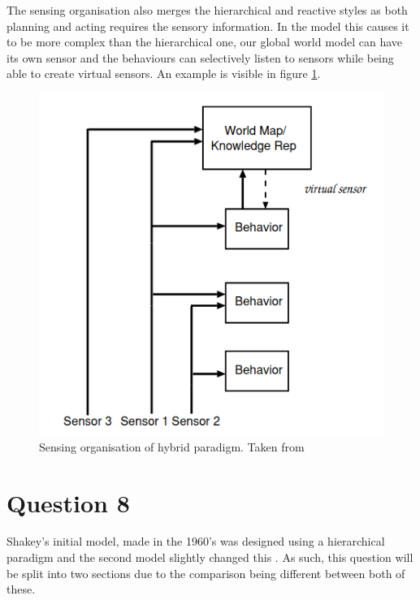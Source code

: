 \documentclass{article}
\newcommand\tab[1][1cm]{\hspace*{#1}}
\begin{document}
\tab The sensing organisation also merges the hierarchical and reactive styles as both planning and
acting requires the sensory
information. In the model this causes it to be more complex than the hierarchical one, our global world model can have its
own sensor and the behaviours can selectively listen to sensors while being able to create virtual sensors.
An example is visible in figure \ref{sOrg}.
\begin{figure}[ht]
    \centering
    \includegraphics[scale=0.5]{img/sensing-organisation.png}
    \caption{Sensing organisation of hybrid paradigm. Taken from \cite{IntroToAI}}
    \label{sOrg}
\end{figure}
\newpage
\section*{Question 8}
Shakey's initial model, made in the 1960's was designed using a hierarchical
paradigm and the second model slightly changed this \cite{shakeyHistory}. As
such, this question will be split into two sections due to the comparison being
different between both of these.
\end{document}
